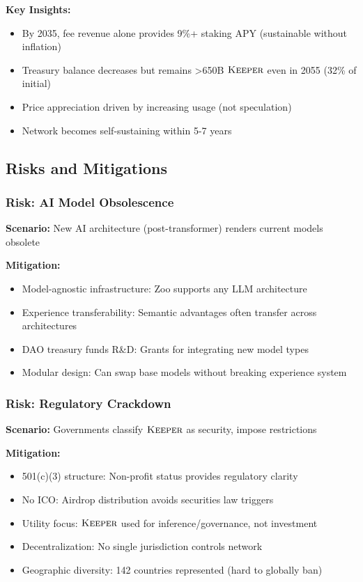 \documentclass[11pt,letterpaper]{article}
\theoremstyle{definition}
\theoremstyle{remark}
\newcommand{\KEEPER}{\textsc{Keeper}}
\begin{document}
\textbf{Key Insights:}
\begin{itemize}
\item By 2035, fee revenue alone provides 9\%+ staking APY (sustainable without inflation)
\item Treasury balance decreases but remains >650B $\KEEPER$ even in 2055 (32\% of initial)
\item Price appreciation driven by increasing usage (not speculation)
\item Network becomes self-sustaining within 5-7 years
\end{itemize}

\subsection{Risks and Mitigations}

\subsubsection{Risk: AI Model Obsolescence}

\textbf{Scenario:} New AI architecture (post-transformer) renders current models obsolete

\textbf{Mitigation:}
\begin{itemize}
\item Model-agnostic infrastructure: Zoo supports any LLM architecture
\item Experience transferability: Semantic advantages often transfer across architectures
\item DAO treasury funds R\&D: Grants for integrating new model types
\item Modular design: Can swap base models without breaking experience system
\end{itemize}

\subsubsection{Risk: Regulatory Crackdown}

\textbf{Scenario:} Governments classify $\KEEPER$ as security, impose restrictions

\textbf{Mitigation:}
\begin{itemize}
\item 501(c)(3) structure: Non-profit status provides regulatory clarity
\item No ICO: Airdrop distribution avoids securities law triggers
\item Utility focus: $\KEEPER$ used for inference/governance, not investment
\item Decentralization: No single jurisdiction controls network
\item Geographic diversity: 142 countries represented (hard to globally ban)
\end{itemize}
\end{document}
